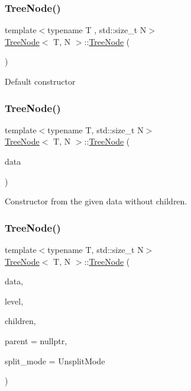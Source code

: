 \subsubsection{\texorpdfstring{Tree\+Node()}{TreeNode()}\hspace{0.1cm}{\footnotesize\ttfamily [1/4]}}
{\footnotesize\ttfamily template$<$typename T , std\+::size\+\_\+t N$>$ \\
\hyperlink{classTreeNode}{Tree\+Node}$<$ T, N $>$\+::\hyperlink{classTreeNode}{Tree\+Node} (\begin{DoxyParamCaption}{ }\end{DoxyParamCaption})}

Default constructor \mbox{\label{classTreeNode_a6549fc1c54bafa84fb41c850f1d4586e}} 
\subsubsection{\texorpdfstring{Tree\+Node()}{TreeNode()}\hspace{0.1cm}{\footnotesize\ttfamily [2/4]}}
{\footnotesize\ttfamily template$<$typename T, std\+::size\+\_\+t N$>$ \\
\hyperlink{classTreeNode}{Tree\+Node}$<$ T, N $>$\+::\hyperlink{classTreeNode}{Tree\+Node} (\begin{DoxyParamCaption}\item[{const T \&}]{data }\end{DoxyParamCaption})}

Constructor from the given data without children. \mbox{\label{classTreeNode_ad5a724100f06f73f002007a2e433932c}} 
\subsubsection{\texorpdfstring{Tree\+Node()}{TreeNode()}\hspace{0.1cm}{\footnotesize\ttfamily [3/4]}}
{\footnotesize\ttfamily template$<$typename T, std\+::size\+\_\+t N$>$ \\
\hyperlink{classTreeNode}{Tree\+Node}$<$ T, N $>$\+::\hyperlink{classTreeNode}{Tree\+Node} (\begin{DoxyParamCaption}\item[{const T \&}]{data,  }\item[{unsigned int}]{level,  }\item[{const std\+::array$<$ \hyperlink{classTreeNode}{Tree\+Node}$<$ T, N $>$ $\ast$, N $>$ \&}]{children,  }\item[{\hyperlink{classTreeNode}{Tree\+Node}$<$ T, N $>$ $\ast$}]{parent = {\ttfamily nullptr},  }\item[{\hyperlink{tree_8h_a922ca07db9633957939f697a65aff11d}{Tree\+Node\+Split\+Mode}}]{split\+\_\+mode = {\ttfamily UnsplitMode} }\end{DoxyParamCaption})}

